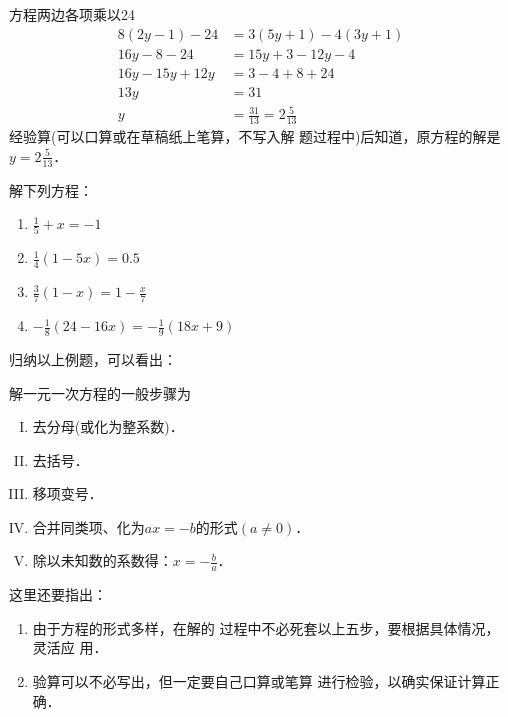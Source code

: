 \begin{solution}
    方程两边各项乘以24
 \begin{align*}
    8 (2y-1)-24&=3 (5y+1)-4 (3y+1)  \tag{去分母}\\
    16y-8-24&=15y + 3-12y-4  \tag{去括号}\\
    16y-15y+12y&=3-4+8+24  \tag{移项}\\
    13y&=31    \tag{合并同类项}\\
    y&=\frac{31}{13}=2\frac{5}{13} \tag{两边除以13}
 \end{align*}   
 经验算(可以口算或在草稿纸上笔算，不写入解
 题过程中)后知道，原方程的解是$y=2\frac{5}{13}$．
\end{solution}

\begin{ex}
解下列方程：
\begin{multicols}{2}
\begin{enumerate}
    \item $\frac{1}{5}+x=-1$
    \item $\frac{1}{4}(1-5x)=0.5$
    \item $\frac{3}{7}(1-x)=1-\frac{x}{7}$
    \item $-\frac{1}{8}(24-16x)=-\frac{1}{9}(18x+9)$
\end{enumerate}
\end{multicols}
\end{ex}

归纳以上例题，可以看出：
\begin{blk}{}
    解一元一次方程的一般步骤为
    \begin{enumerate}[I.]
        \item 去分母(或化为整系数)．
        \item 去括号．
        \item 移项变号．
        \item 合并同类项、化为$ax=-b$的形式$(a\ne 0)$．
        \item 除以未知数的系数得：$x=-\frac{b}{a}$．
    \end{enumerate}
\end{blk}
      
这里还要指出：
\begin{enumerate}
    \item 由于方程的形式多样，在解的
过程中不必死套以上五步，要根据具体情况，灵活应
用．
\item 验算可以不必写出，但一定要自己口算或笔算
进行检验，以确实保证计算正确．
\end{enumerate}

